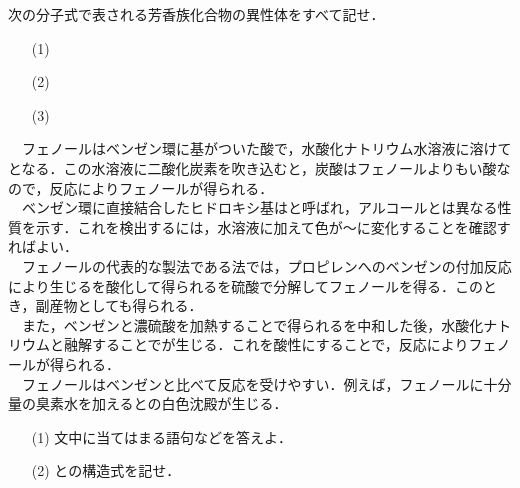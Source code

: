 \documentclass[a4paper,11pt]{ltjsarticle}
\begin{document}
  \newpage
  \begin{que}
   次の分子式で表される芳香族化合物の異性体をすべて記せ．
   \begin{itemize}
    \item [(1)]
    \item [(2)]
    \item [(3)]
   \end{itemize}
  \end{que}
  \newpage
  \begin{que} 　フェノールはベンゼン環に基がついた酸で，水酸化ナトリウム水溶液に溶けてとなる．この水溶液に二酸化炭素を吹き込むと，炭酸はフェノールよりもい酸なので，反応によりフェノールが得られる．\\
 　ベンゼン環に直接結合したヒドロキシ基はと呼ばれ，アルコールとは異なる性質を示す．これを検出するには，水溶液に加えて色が〜に変化することを確認すればよい．\\
 　フェノールの代表的な製法である法では，プロピレンへのベンゼンの付加反応により生じるを酸化して得られるを硫酸で分解してフェノールを得る．このとき，副産物としても得られる．\\
 　また，ベンゼンと濃硫酸を加熱することで得られるを中和した後，水酸化ナトリウムと融解することでが生じる．これを酸性にすることで，反応によりフェノールが得られる．\\
　フェノールはベンゼンと比べて反応を受けやすい．例えば，フェノールに十分量の臭素水を加えるとの白色沈殿が生じる．
 \begin{itemize}
    \item [(1)]文中に当てはまる語句などを答えよ．
    \item [(2)]との構造式を記せ．
 \end{itemize}
\end{que}
\newpage
\end{document}
